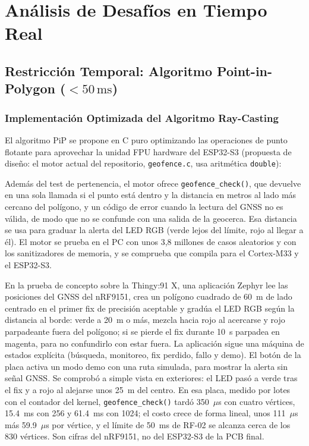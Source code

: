 \section{Análisis de Desafíos en Tiempo Real}

\subsection{Restricción Temporal: Algoritmo Point-in-Polygon ($< 50\,\text{ms}$)}

\subsubsection{Implementación Optimizada del Algoritmo Ray-Casting}

El algoritmo PiP se propone en C puro optimizando las operaciones de punto flotante para aprovechar la unidad FPU hardware del ESP32-S3 (propuesta de diseño: el motor actual del repositorio, \texttt{geofence.c}, usa aritmética \texttt{double}):

Además del test de pertenencia, el motor ofrece \texttt{geofence\_check()}, que devuelve en una sola llamada si el punto está dentro y la distancia en metros al lado más cercano del polígono, y un código de error cuando la lectura del GNSS no es válida, de modo que no se confunde con una salida de la geocerca. Esa distancia se usa para graduar la alerta del LED RGB (verde lejos del límite, rojo al llegar a él). El motor se prueba en el PC con unos 3,8 millones de casos aleatorios y con los sanitizadores de memoria, y se comprueba que compila para el Cortex-M33 y el ESP32-S3.

En la prueba de concepto sobre la Thingy:91 X, una aplicación Zephyr lee las posiciones del GNSS del nRF9151, crea un polígono cuadrado de 60~m de lado centrado en el primer fix de precisión aceptable y gradúa el LED RGB según la distancia al borde: verde a 20~m o más, mezcla hacia rojo al acercarse y rojo parpadeante fuera del polígono; si se pierde el fix durante 10~s parpadea en magenta, para no confundirlo con estar fuera. La aplicación sigue una máquina de estados explícita (búsqueda, monitoreo, fix perdido, fallo y demo). El botón de la placa activa un modo demo con una ruta simulada, para mostrar la alerta sin señal GNSS. Se comprobó a simple vista en exteriores: el LED pasó a verde tras el fix y a rojo al alejarse unos 25~m del centro. En esa placa, medido por lotes con el contador del kernel, \texttt{geofence\_check()} tardó 350~$\mu$s con cuatro vértices, 15.4~ms con 256 y 61.4~ms con 1024; el costo crece de forma lineal, unos 111~$\mu$s más 59.9~$\mu$s por vértice, y el límite de 50~ms de RF-02 se alcanza cerca de los 830 vértices. Son cifras del nRF9151, no del ESP32-S3 de la PCB final.

